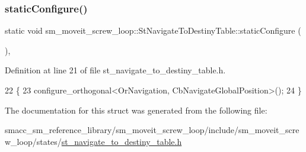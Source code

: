 \subsubsection{\texorpdfstring{static\+Configure()}{staticConfigure()}}
{\footnotesize\ttfamily static void sm\+\_\+moveit\+\_\+screw\+\_\+loop\+::\+St\+Navigate\+To\+Destiny\+Table\+::static\+Configure (\begin{DoxyParamCaption}{ }\end{DoxyParamCaption})\hspace{0.3cm}{\ttfamily [inline]}, {\ttfamily [static]}}



Definition at line 21 of file st\+\_\+navigate\+\_\+to\+\_\+destiny\+\_\+table.\+h.


\begin{DoxyCode}
22         \{
23             configure\_orthogonal<OrNavigation, CbNavigateGlobalPosition>();
24         \}
\end{DoxyCode}


The documentation for this struct was generated from the following file\+:\begin{DoxyCompactItemize}
\item 
smacc\+\_\+sm\+\_\+reference\+\_\+library/sm\+\_\+moveit\+\_\+screw\+\_\+loop/include/sm\+\_\+moveit\+\_\+screw\+\_\+loop/states/\hyperlink{sm__moveit__screw__loop_2include_2sm__moveit__screw__loop_2states_2st__navigate__to__destiny__table_8h}{st\+\_\+navigate\+\_\+to\+\_\+destiny\+\_\+table.\+h}\end{DoxyCompactItemize}

